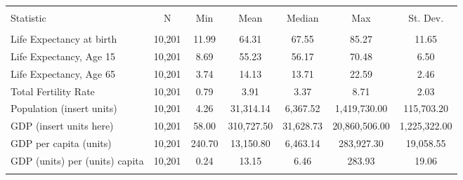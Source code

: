 
\begin{tabular}{@{\extracolsep{5pt}}lcccccc} 
\\[-1.8ex]\hline \\[-1.8ex] 
Statistic & \multicolumn{1}{c}{N} & \multicolumn{1}{c}{Min} & \multicolumn{1}{c}{Mean} & \multicolumn{1}{c}{Median} & \multicolumn{1}{c}{Max} & \multicolumn{1}{c}{St. Dev.} \\ 
\hline 
\hline \\[-1.8ex] 
Life Expectancy at birth & 10,201 & 11.99 & 64.31 & 67.55 & 85.27 & 11.65 \\ 
Life Expectancy, Age 15 & 10,201 & 8.69 & 55.23 & 56.17 & 70.48 & 6.50 \\ 
Life Expectancy, Age 65 & 10,201 & 3.74 & 14.13 & 13.71 & 22.59 & 2.46 \\ 
Total Fertility Rate & 10,201 & 0.79 & 3.91 & 3.37 & 8.71 & 2.03 \\ 
Population (insert units) & 10,201 & 4.26 & 31,314.14 & 6,367.52 & 1,419,730.00 & 115,703.20 \\ 
GDP (insert units here) & 10,201 & 58.00 & 310,727.50 & 31,628.73 & 20,860,506.00 & 1,225,322.00 \\ 
GDP per capita (units) & 10,201 & 240.70 & 13,150.80 & 6,463.14 & 283,927.30 & 19,058.55 \\ 
GDP (units) per (units) capita & 10,201 & 0.24 & 13.15 & 6.46 & 283.93 & 19.06 \\ 
\hline 
\hline \\[-1.8ex] 
\end{tabular} 
